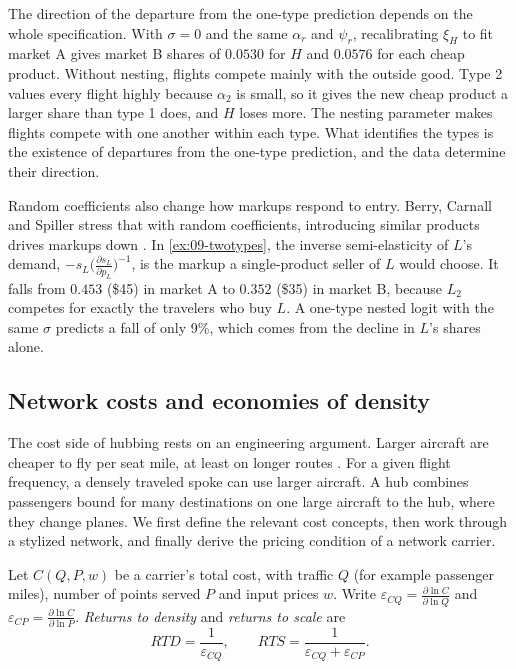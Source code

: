 \begin{remark}\label{rem:09-twotypes-sigma}
The direction of the departure from the one-type prediction depends on the whole specification. With
$\sigma=0$ and the same $\alpha_r$ and $\psi_r$, recalibrating $\xi_H$ to fit market A gives market B
shares of $0.0530$ for $H$ and $0.0576$ for each cheap product. Without nesting, flights compete mainly
with the outside good. Type 2 values every flight highly because $\alpha_2$ is small, so it gives the new
cheap product a larger share than type 1 does, and $H$ loses more. The nesting parameter makes flights
compete with one another within each type. What identifies the types is the existence of departures from
the one-type prediction, and the data determine their direction.
\end{remark}

Random coefficients also change how markups respond to entry. Berry, Carnall and Spiller stress that with
random coefficients, introducing similar products drives markups down \citep[p.~18]{BerryCarnallSpiller2006}.
In \cref{ex:09-twotypes}, the inverse semi-elasticity of $L$'s demand,
$-s_L\big(\frac{\partial s_L}{\partial p_L}\big)^{-1}$, is the markup a single-product seller of $L$ would choose. It falls from $0.453$ (\$45) in market A
to $0.352$ (\$35) in market B, because $L_2$ competes for exactly the travelers who buy $L$. A one-type
nested logit with the same $\sigma$ predicts a fall of only 9\%, which comes from the decline in $L$'s
shares alone.

\subsection{Network costs and economies of density}\label{sec:09-pricing-network}

The cost side of hubbing rests on an engineering argument. Larger aircraft are cheaper to fly per seat
mile, at least on longer routes \citep[pp.~3--4]{BerryCarnallSpiller2006}. For a given flight frequency, a
densely traveled spoke can use larger aircraft. A hub combines passengers bound for many destinations
on one large aircraft to the hub, where they change planes. We first define the relevant cost concepts,
then work through a stylized network, and finally derive the pricing condition of a network carrier.

\begin{definition}\label{def:09-rtd}
Let $C(Q,P,w)$ be a carrier's total cost, with traffic $Q$ (for example passenger miles), number of
points served $P$ and input prices $w$. Write $\varepsilon_{CQ}=\frac{\partial\ln C}{\partial\ln Q}$ and
$\varepsilon_{CP}=\frac{\partial\ln C}{\partial\ln P}$. \emph{Returns to density} and \emph{returns to
scale} are
\begin{equation}\label{eq:09-rtd}
RTD=\frac{1}{\varepsilon_{CQ}},\qquad RTS=\frac{1}{\varepsilon_{CQ}+\varepsilon_{CP}} .
\end{equation}
\end{definition}

